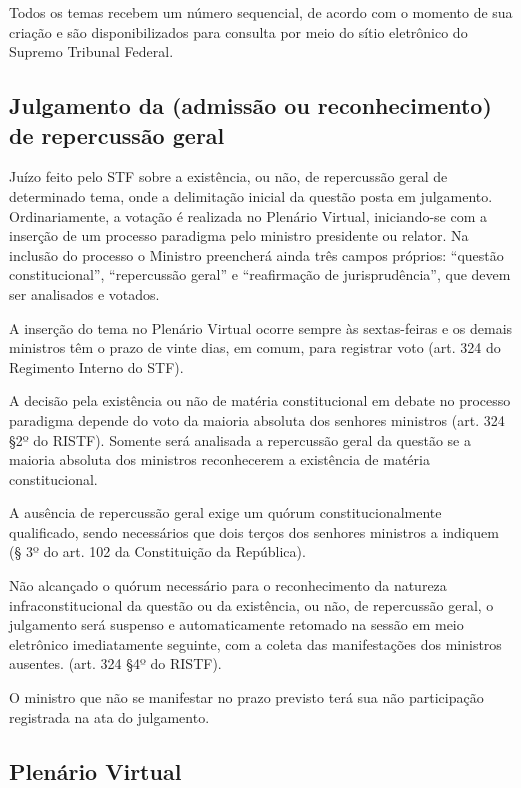 \documentclass[
]{book}
\begin{document}
Todos os temas recebem um número sequencial, de acordo com o momento de sua criação e são disponibilizados para consulta por meio do sítio eletrônico do Supremo Tribunal Federal.

\hypertarget{julgamento-da-admissuxe3o-ou-reconhecimento-de-repercussuxe3o-geral}{%
\subsection{Julgamento da (admissão ou reconhecimento) de repercussão geral}\label{julgamento-da-admissuxe3o-ou-reconhecimento-de-repercussuxe3o-geral}}

Juízo feito pelo STF sobre a existência, ou não, de repercussão geral de determinado tema, onde a delimitação inicial da questão posta em julgamento. Ordinariamente, a votação é realizada no Plenário Virtual, iniciando-se com a inserção de um processo paradigma pelo ministro presidente ou relator. Na inclusão do processo o Ministro preencherá ainda três campos próprios: ``questão constitucional'', ``repercussão geral'' e ``reafirmação de jurisprudência'', que devem ser analisados e votados.

A inserção do tema no Plenário Virtual ocorre sempre às sextas-feiras e os demais ministros têm o prazo de vinte dias, em comum, para registrar voto (art. 324 do Regimento Interno do STF).

A decisão pela existência ou não de matéria constitucional em debate no processo paradigma depende do voto da maioria absoluta dos senhores ministros (art. 324 §2º do RISTF). Somente será analisada a repercussão geral da questão se a maioria absoluta dos ministros reconhecerem a existência de matéria constitucional.

A ausência de repercussão geral exige um quórum constitucionalmente qualificado, sendo necessários que dois terços dos senhores ministros a indiquem (§ 3º do art. 102 da Constituição da República).

Não alcançado o quórum necessário para o reconhecimento da natureza infraconstitucional da questão ou da existência, ou não, de repercussão geral, o julgamento será suspenso e automaticamente retomado na sessão em meio eletrônico imediatamente seguinte, com a coleta das manifestações dos ministros ausentes. (art. 324 §4º do RISTF).

O ministro que não se manifestar no prazo previsto terá sua não participação registrada na ata do julgamento.

\hypertarget{plenuxe1rio-virtual}{%
\subsection{Plenário Virtual}\label{plenuxe1rio-virtual}}
\end{document}
